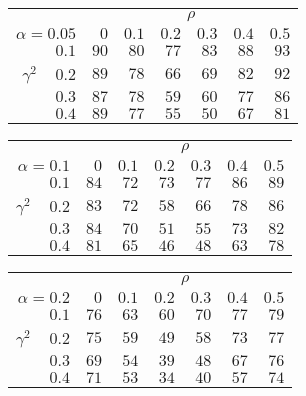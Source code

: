 \begin{tabular}{r|rrrrrr}
\hline\hline
 &\multicolumn{6}{c}{$\rho$} \\ 
 $\alpha = 0.05$ & $0$ & $0.1$ & $0.2$ & $0.3$ & $0.4$ & $0.5$ \\ 
 \hline$0.1$ & $90$ & $80$ & $77$ & $83$ & $88$ & $93$\\ 
$\gamma^2\;\;\;$ $0.2$ & $89$ & $78$ & $66$ & $69$ & $82$ & $92$\\ 
$0.3$ & $87$ & $78$ & $59$ & $60$ & $77$ & $86$\\ 
$0.4$ & $89$ & $77$ & $55$ & $50$ & $67$ & $81$\\ 
 \hline 
 \end{tabular}
 
 \vspace{2em} 
 
\begin{tabular}{r|rrrrrr}
\hline\hline
 &\multicolumn{6}{c}{$\rho$} \\ 
 $\alpha = 0.1$ & $0$ & $0.1$ & $0.2$ & $0.3$ & $0.4$ & $0.5$ \\ 
 \hline$0.1$ & $84$ & $72$ & $73$ & $77$ & $86$ & $89$\\ 
$\gamma^2\;\;\;$ $0.2$ & $83$ & $72$ & $58$ & $66$ & $78$ & $86$\\ 
$0.3$ & $84$ & $70$ & $51$ & $55$ & $73$ & $82$\\ 
$0.4$ & $81$ & $65$ & $46$ & $48$ & $63$ & $78$\\ 
 \hline 
 \end{tabular}
 
 \vspace{2em} 
 
\begin{tabular}{r|rrrrrr}
\hline\hline
 &\multicolumn{6}{c}{$\rho$} \\ 
 $\alpha = 0.2$ & $0$ & $0.1$ & $0.2$ & $0.3$ & $0.4$ & $0.5$ \\ 
 \hline$0.1$ & $76$ & $63$ & $60$ & $70$ & $77$ & $79$\\ 
$\gamma^2\;\;\;$ $0.2$ & $75$ & $59$ & $49$ & $58$ & $73$ & $77$\\ 
$0.3$ & $69$ & $54$ & $39$ & $48$ & $67$ & $76$\\ 
$0.4$ & $71$ & $53$ & $34$ & $40$ & $57$ & $74$\\ 
 \hline 
 \end{tabular}
